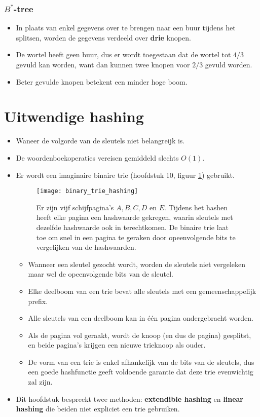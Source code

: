 \subsubsection{$B^*$-tree}
\begin{itemize}
    \item In plaats van enkel gegevens over te brengen naar een buur tijdens het splitsen, worden de gegevens verdeeld over \textbf{drie} knopen.
    \item De wortel heeft geen buur, dus er wordt toegestaan dat de wortel tot $4/3$ gevuld kan worden, want dan kunnen twee knopen voor $2/3$ gevuld worden.
    \item Beter gevulde knopen betekent een minder hoge boom.
\end{itemize}
\section{Uitwendige hashing}
\begin{itemize}
    \item Waneer de volgorde van de sleutels niet belangreijk is.
    \item De woordenboekoperaties vereisen gemiddeld slechts $O(1)$.
    \item Er wordt een imaginaire binaire trie (hoofdstuk 10, figuur \ref{fig:binary_trie_hashing}) gebruikt.
    \begin{figure}[ht]
        \centering
        \texttt{[image: binary\_trie\_hashing]}
        \caption{Er zijn vijf schijfpagina's $A, B, C, D$ en $E$. Tijdens het hashen heeft elke pagina een hashwaarde gekregen, waarin sleutels met dezelfde hashwaarde ook in terechtkomen. De binaire trie laat toe om snel in een pagina te geraken door opeenvolgende bits te vergelijken van de hashwaarden.}
        \label{fig:binary_trie_hashing}
    \end{figure}
    \begin{itemize}
        \item Wanneer een sleutel gezocht wordt, worden de sleutels niet vergeleken maar wel de opeenvolgende bits van de sleutel.
        \item Elke deelboom van een trie bevat alle sleutels met een gemeenschappelijk prefix.
        \item Alle sleutels van een deelboom kan in één pagina ondergebracht worden.
        \item Als de pagina vol geraakt, wordt de knoop (en dus de pagina) gesplitst, en beide pagina's krijgen een nieuwe trieknoop als ouder.
        \item De vorm van een trie is enkel afhankelijk van de bits van de sleutels, dus een goede hashfunctie geeft voldoende garantie dat deze trie evenwichtig zal zijn.
    \end{itemize}
    \item Dit hoofdstuk bespreekt twee methoden: \textbf{extendible hashing} en \textbf{linear hashing} die beiden niet expliciet een trie gebruiken.

\end{itemize}

